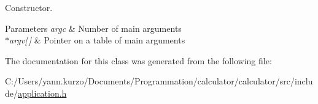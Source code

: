 Constructor. 


\begin{DoxyParams}{Parameters}
{\em argc} & Number of main arguments \\
\hline
{\em $\ast$argv\mbox{[}$\,$\mbox{]}} & Pointer on a table of main arguments \\
\hline
\end{DoxyParams}


The documentation for this class was generated from the following file\+:\begin{DoxyCompactItemize}
\item 
C\+:/\+Users/yann.\+kurzo/\+Documents/\+Programmation/calculator/calculator/src/include/\hyperlink{application_8h}{application.\+h}\end{DoxyCompactItemize}
